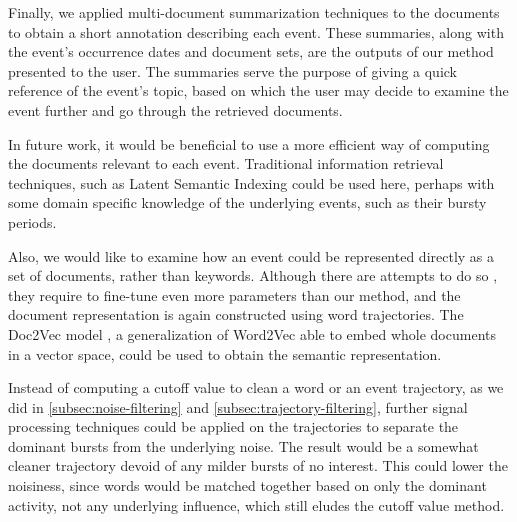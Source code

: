 Finally, we applied multi-document summarization techniques to the documents to obtain a short annotation describing each event. These summaries, along with the event's occurrence dates and document sets, are the outputs of our method presented to the user. The summaries serve the purpose of giving a quick reference of the event's topic, based on which the user may decide to examine the event further and go through the retrieved documents.

In future work, it would be beneficial to use a more efficient way of computing the documents relevant to each event. Traditional information retrieval techniques, such as Latent Semantic Indexing \citep{lsi} could be used here, perhaps with some domain specific knowledge of the underlying events, such as their bursty periods.

Also, we would like to examine how an event could be represented directly as a set of documents, rather than keywords. Although there are attempts to do so \citep{document-bursty-representation}, they require to fine-tune even more parameters than our method, and the document representation is again constructed using word trajectories. The Doc2Vec model \citep{doc2vec}, a generalization of Word2Vec able to embed whole documents in a vector space, could be used to obtain the semantic representation.

Instead of computing a cutoff value to clean a word or an event trajectory, as we did in \autoref{subsec:noise-filtering} and \autoref{subsec:trajectory-filtering}, further signal processing techniques could be applied on the trajectories to separate the dominant bursts from the underlying noise. The result would be a somewhat cleaner trajectory devoid of any milder bursts of no interest. This could lower the noisiness, since words would be matched together based on only the dominant activity, not any underlying influence, which still eludes the cutoff value method.